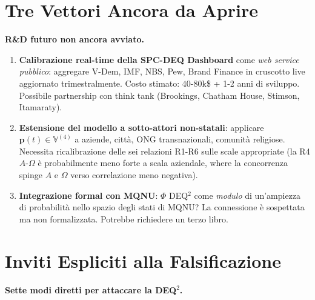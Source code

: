 \section{Tre Vettori Ancora da
Aprire}\label{tre-vettori-ancora-da-aprire}

\Hypoth{} \textbf{R\&D futuro non ancora avviato.}

\begin{enumerate}
\def\labelenumi{\arabic{enumi}.}
\tightlist
\item
  \textbf{Calibrazione real-time della SPC-DEQ Dashboard} come \emph{web
  service pubblico}: aggregare V-Dem, IMF, NBS, Pew, Brand Finance in
  cruscotto live aggiornato trimestralmente. Costo stimato:
  \(40\)-\(80\)k\$ + 1-2 anni di sviluppo. Possibile partnership con
  think tank (Brookings, Chatham House, Stimson, Itamaraty).
\item
  \textbf{Estensione del modello a sotto-attori non-statali}: applicare
  \(\boldsymbol{p}(t) \in \mathbb{V}^{(4)}\) a aziende, città, ONG
  transnazionali, comunità religiose. Necessita ricalibrazione delle sei
  relazioni R1-R6 sulle scale appropriate (la R4 \(A\)-\(\Omega\) è
  probabilmente meno forte a scala aziendale, where la concorrenza spinge
  \(A\) e \(\Omega\) verso correlazione meno negativa).
\item
  \textbf{Integrazione formal con MQNU}: \(\Phi\) DEQ$^2$ come
  \emph{modulo} di un'ampiezza di probabilità nello spazio degli stati
  di MQNU? La connessione è sospettata ma non formalizzata. Potrebbe
  richiedere un terzo libro.
\end{enumerate}



\section{Inviti Espliciti alla
Falsificazione}\label{inviti-espliciti-alla-falsification}

\Hypoth{} \textbf{Sette modi diretti per attaccare la DEQ$^2$.}

